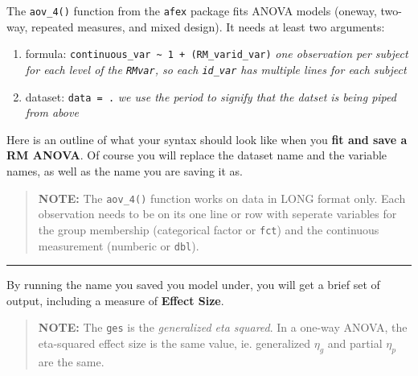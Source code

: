 \documentclass[]{article}
\newenvironment{Shaded}{\begin{snugshade}}{\end{snugshade}}
\newcommand{\KeywordTok}[1]{\textcolor[rgb]{0.13,0.29,0.53}{\textbf{#1}}}
\newcommand{\DataTypeTok}[1]{\textcolor[rgb]{0.13,0.29,0.53}{#1}}
\newcommand{\DecValTok}[1]{\textcolor[rgb]{0.00,0.00,0.81}{#1}}
\newcommand{\StringTok}[1]{\textcolor[rgb]{0.31,0.60,0.02}{#1}}
\newcommand{\CommentTok}[1]{\textcolor[rgb]{0.56,0.35,0.01}{\textit{#1}}}
\newcommand{\OperatorTok}[1]{\textcolor[rgb]{0.81,0.36,0.00}{\textbf{#1}}}
\newcommand{\NormalTok}[1]{#1}
\begin{document}
The \texttt{aov\_4()} function from the \texttt{afex} package fits ANOVA
models (oneway, two-way, repeated measures, and mixed design). It needs
at least two arguments:

\begin{enumerate}
\def\labelenumi{\arabic{enumi}.}
\item
  formula:
  \texttt{continuous\_var\ \textasciitilde{}\ 1\ +\ (RM\_var\textbar{}id\_var)}
  \emph{one observation per subject for each level of the
  \texttt{RMvar}, so each \texttt{id\_var} has multiple lines for each
  subject}
\item
  dataset: \texttt{data\ =\ .} \emph{we use the period to signify that
  the datset is being piped from above}
\end{enumerate}

Here is an outline of what your syntax should look like when you
\textbf{fit and save a RM ANOVA}. Of course you will replace the dataset
name and the variable names, as well as the name you are saving it as.

\begin{quote}
\textbf{NOTE:} The \texttt{aov\_4()} function works on data in LONG
format only. Each observation needs to be on its one line or row with
seperate variables for the group membership (categorical factor or
\texttt{fct}) and the continuous measurement (numberic or \texttt{dbl}).
\end{quote}

\begin{Shaded}
\end{Shaded}

\begin{center}\rule{0.5\linewidth}{\linethickness}\end{center}

By running the name you saved you model under, you will get a brief set
of output, including a measure of \textbf{Effect Size}.

\begin{quote}
\textbf{NOTE:} The \texttt{ges} is the \emph{generalized eta squared}.
In a one-way ANOVA, the eta-squared effect size is the same value, ie.
generalized \(\eta_g\) and partial \(\eta_p\) are the same.
\end{quote}
\end{document}
